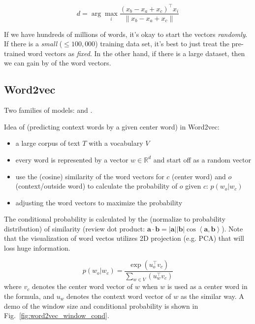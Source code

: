 \begin{equation}
d = \arg \max_i \frac{(x_b - x_a + x_c)^\top x_i}{\lVert x_b - x_a + x_c \rVert}
\end{equation}

If we have hundreds of millions of words, it's okay to start the vectors \emph{randomly}.
If there is a \emph{small} ($\le 100,000$) training data set, it's best to just treat the pre-trained word vectors as \emph{fixed}.
In the other hand, if there is a large dataset, then we can gain by  of the word vectors.

\subsection{Word2vec}

Two families of models:  and .

Idea of  (predicting context words by a given center word) in  Word2vec:

\begin{itemize}
	\item a large corpus of text $T$ with a vocabulary $V$
	\item every word is represented by a vector $w \in \mathbb{R}^d$ and start off as a random vector
	\item use the (cosine) similarity of the word vectors for $c$ (center word) and $o$ (context/outside word) to calculate the probability of $o$ given $c$: $p(w_o | w_c)$
	\item adjusting the word vectors to maximize the probability
\end{itemize}


The conditional probability is calculated by the  (normalize to probability distribution) of  similarity (review dot product: $\bm{a} \cdot \bm{b} = |\bm{a}||\bm{b}| \cos\left<\bm{a}, \bm{b}\right>$).
Note that the visualization of word vectos utilizes 2D projection (e.g. PCA) that will loss huge information.

\begin{equation}
p(w_o | w_c) = \frac{\exp(u_o^\top v_c)}{\sum_{w \in V}(u_w^\top v_c)}
\end{equation}
where $v_c$ denotes the center word vector of $w$ when $w$ is used as a center word in the formula, and $u_w$ denotes the context word vector of $w$ as the similar way.
A demo of the window size and conditional probability is shown in Fig.~\ref{fig:word2vec_window_cond}.

